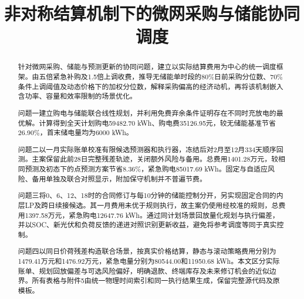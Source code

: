 \documentclass[withoutpreface,bwprint]{cumcmthesis}
\title{非对称结算机制下的微网采购与储能协同调度}
\begin{document}
\maketitle
\begin{abstract}
针对微网采购、储能与预测更新的协同问题，建立以实际结算费用为中心的统一调度框架。由五倍紧急补购及1.5倍上调收费，推导无储能单时段的80\%日前采购分位数、70\%条件上调阈值及动态价格下的加权分位数，解释采购偏高的经济动机，再将该机制嵌入含功率、容量和效率限制的场景优化。

问题一建立购电与储能联合线性规划，并利用免费弃余条件证明存在不同时充放电的最优解。计算得到全天计划购电59482.70 kWh、购电费35126.95元，较无储能基准节省26.90\%，首末储电量均为6000 kWh。

问题二以一月实际账单校准有限候选预测器和执行器，冻结后对2月至12月334天顺序回测。主案保留此前28日完整残差轨迹，关闭额外风险与备用。总费用1401.28万元，较相同预测及初态下的点预测方案节省8.36\%，紧急购电85017.69 kWh。固定与自适应风险、备用单独及联合对照显示，附加保守机制并不普遍节费。

问题三将0、6、12、18时的合同修订与每10分钟的储能控制分开，另实现固定合同的内层LP及跨日续接候选。其一月费用未优于规则执行，故主案仍使用经校准的规则，总费用1397.58万元，紧急购电12647.76 kWh。通过同计划场景回放量化规划与执行偏差，并以SOC、新光伏和负荷反馈的递进对照识别更新收益，避免将参考调度等同于真实控制。

问题四以同日价荷残差构造联合场景，按真实价格结算，静态与滚动策略费用分别为1479.41万元和1476.92万元，紧急电量分别为80544.00和11950.68 kWh。本文区分实际账单、规划回放偏差与可选风险偏好，明确退款、终端库存及未来修订机会的近似边界。所有表格与附件5由统一物理时间索引和同一执行结果生成，保留完整源代码及原模板。

\end{abstract}







\FloatBarrier
{}


\clearpage
\begin{appendices}

\end{appendices}
\end{document}
